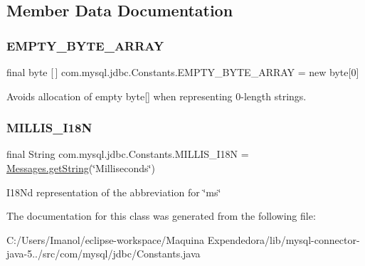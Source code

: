 \subsection{Member Data Documentation}
\mbox{\label{classcom_1_1mysql_1_1jdbc_1_1_constants_ae6f611858f631366604c7fab818560f8}} 
\subsubsection{\texorpdfstring{E\+M\+P\+T\+Y\+\_\+\+B\+Y\+T\+E\+\_\+\+A\+R\+R\+AY}{EMPTY\_BYTE\_ARRAY}}
{\footnotesize\ttfamily final byte \mbox{[}$\,$\mbox{]} com.\+mysql.\+jdbc.\+Constants.\+E\+M\+P\+T\+Y\+\_\+\+B\+Y\+T\+E\+\_\+\+A\+R\+R\+AY = new byte\mbox{[}0\mbox{]}\hspace{0.3cm}{\ttfamily [static]}}

Avoids allocation of empty byte\mbox{[}\mbox{]} when representing 0-\/length strings. \mbox{\label{classcom_1_1mysql_1_1jdbc_1_1_constants_af4c9f4ec44a1a2ddfc51f06fc081af08}} 
\subsubsection{\texorpdfstring{M\+I\+L\+L\+I\+S\+\_\+\+I18N}{MILLIS\_I18N}}
{\footnotesize\ttfamily final String com.\+mysql.\+jdbc.\+Constants.\+M\+I\+L\+L\+I\+S\+\_\+\+I18N = \mbox{\hyperlink{classcom_1_1mysql_1_1jdbc_1_1_messages_ad6d3160126b07ad0d56d97250bed8412}{Messages.\+get\+String}}(\char`\"{}Milliseconds\char`\"{})\hspace{0.3cm}{\ttfamily [static]}}

I18N\textquotesingle{}d representation of the abbreviation for \char`\"{}ms\char`\"{} 

The documentation for this class was generated from the following file\+:\begin{DoxyCompactItemize}
\item 
C\+:/\+Users/\+Imanol/eclipse-\/workspace/\+Maquina Expendedora/lib/mysql-\/connector-\/java-\/5../src/com/mysql/jdbc/Constants.\+java\end{DoxyCompactItemize}
